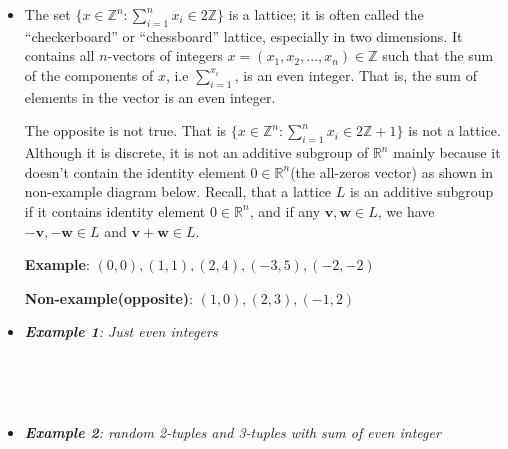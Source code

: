\documentclass[11pt]{article}
\providecommand{\tightlist}{%
      \setlength{\itemsep}{0pt}\setlength{\parskip}{0pt}}
\begin{document}
    \begin{itemize}
\item
  The set \(\{x ∈ \mathbb{Z}^n : \sum_{i=1}^nx_i ∈ 2\mathbb{Z}\}\) is a
  lattice; it is often called the ``checkerboard'' or ``chessboard''
  lattice, especially in two dimensions. It contains all \(n\)-vectors
  of integers \(x = (x_1, x_2,...,x_n) \in \mathbb{Z}\) such that the
  sum of the components of \(x\), i.e \(\sum_{i = 1}^{x_i}\), is an even
  integer. That is, the sum of elements in the vector is an even
  integer.

  The opposite is not true. That is
  \(\{x ∈ \mathbb{Z}^n : \sum_{i=1}^nx_i ∈ 2\mathbb{Z} + 1\}\) is not a
  lattice. Although it is discrete, it is not an additive subgroup of
  \(\mathbb{R}^n\) mainly because it doesn't contain the identity
  element \(0 \in \mathbb{R}^n\)(the all-zeros vector) as shown in
  non-example diagram below. Recall, that a lattice \(L\) is an additive
  subgroup if it contains identity element \(0 \in \mathbb{R}^n\), and
  if any \(\mathbf{v}, \mathbf{w} \in L\), we have
  \(-\mathbf{v}, -\mathbf{w} \in L\) and
  \(\mathbf{v} + \mathbf{w} \in L\).

  \textbf{Example}: \((0,0),(1,1),(2,4),(−3,5),(−2,−2)\)

  \textbf{Non-example(opposite)}: \((1,0),(2,3),(−1,2)\)
\end{itemize}

    \begin{itemize}
\tightlist
\item
  \emph{\textbf{Example 1}: Just even integers}
\end{itemize}

    \begin{center}
    \end{center}
    { \hspace*{\fill} \\}
    
    \begin{center}
    \end{center}
    { \hspace*{\fill} \\}
    
    \begin{itemize}
\tightlist
\item
  \emph{\textbf{Example 2}: random 2-tuples and 3-tuples with sum of
  even integer}
\end{itemize}
\end{document}
